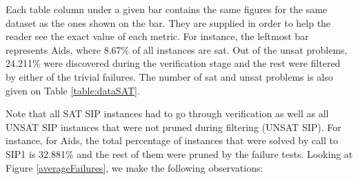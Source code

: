 \documentclass{l4proj}
\begin{document}
Each table column under a given bar contains the same figures for the same dataset as the ones shown on the bar. They are supplied in order to help the reader see the exact value of each metric. For instance, the leftmost bar represents Aids, where 8.67\% of all instances are \gls{sat}. Out of the \gls{unsat} problems, 24.211\% were discovered during the verification stage and the rest were filtered by either of the trivial failures. The number of \gls{sat} and \gls{unsat} problems is also given on Table \ref{table:dataSAT}.

Note that all SAT SIP instances had to go through verification as well as all UNSAT SIP instances that were not pruned during filtering (UNSAT SIP). For instance, for Aids, the total percentage of instances that were solved by call to SIP1 is 32.881\% and the rest of them were pruned by the failure tests. Looking at Figure \ref{averageFailures}, we make the following observations:
\end{document}
